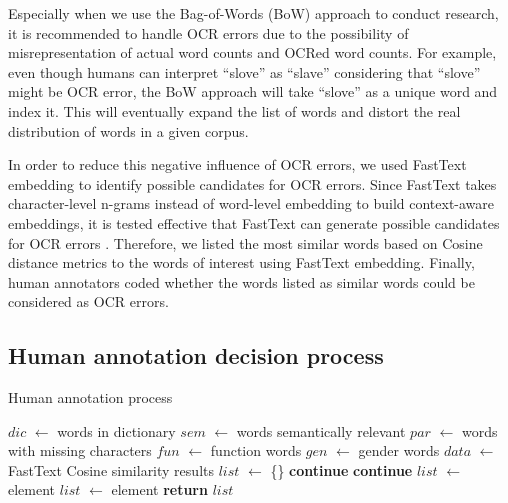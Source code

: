 \documentclass[11pt]{article}
\begin{document}
Especially when we use the Bag-of-Words (BoW) approach to conduct research, it is recommended to handle OCR errors due to the possibility of misrepresentation of actual word counts and OCRed word counts. 
For example, even though humans can interpret ``slove'' as ``slave'' considering that ``slove'' might be OCR error, the BoW approach will take ``slove'' as a unique word and index it. 
This will eventually expand the list of words and distort the real distribution of words in a given corpus.

In order to reduce this negative influence of OCR errors, we used FastText embedding \citep{bojanowski_enriching_2017} to identify possible candidates for OCR errors. 
Since FastText takes character-level n-grams instead of word-level embedding to build context-aware embeddings, it is tested effective that FastText can generate possible candidates for OCR errors \citep{hajiali_generating_2022}. 
Therefore, we listed the most similar words based on Cosine distance metrics to the words of interest using FastText embedding. 
Finally, human annotators coded whether the words listed as similar words could be considered as OCR errors. 

\subsection{Human annotation decision process} \label{human annotation decision process}

\begin{algorithm}[h]
  \raggedright
  \caption{Human annotation process}\label{alg:human}
  \begin{algorithmic}[1]
  \STATE $dic$ $\leftarrow$ words in dictionary
  \STATE $sem$ $\leftarrow$ words semantically relevant
  \STATE $par$ $\leftarrow$ words with missing characters
  \STATE $fun$ $\leftarrow$ function words
  \STATE $gen$ $\leftarrow$ gender words
  \STATE $data$ $\leftarrow$ FastText Cosine similarity results
  \STATE $list$ $\leftarrow$ \{\}
      \STATE \textbf{continue}
      \STATE \textbf{continue}
      \STATE $list$ $\leftarrow$ element
      \STATE $list$ $\leftarrow$ element
    \ENDIF
  \ENDFOR
  \STATE \textbf{return} $list$
  \end{algorithmic}
\end{algorithm}
\end{document}
